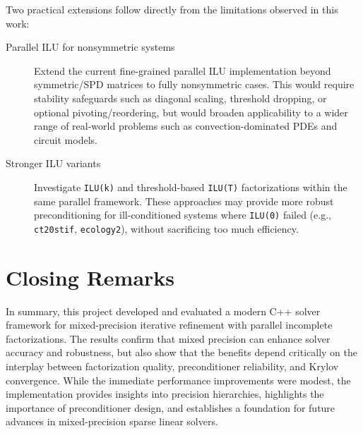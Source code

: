 Two practical extensions follow directly from the limitations observed in this
work:

\begin{description}
\item[Parallel ILU for nonsymmetric systems] Extend the current fine-grained
  parallel ILU implementation beyond symmetric/SPD matrices to fully
  nonsymmetric cases. This would require stability safeguards such as diagonal
  scaling, threshold dropping, or optional pivoting/reordering, but would
  broaden applicability to a wider range of real-world problems such as
  convection-dominated PDEs and circuit models.

\item[Stronger ILU variants] Investigate \texttt{ILU(k)} and threshold-based \texttt{ILU(T)}
  factorizations within the same parallel framework. These approaches may
  provide more robust preconditioning for ill-conditioned systems where
  \texttt{ILU(0)} failed (e.g., \texttt{ct20stif}, \texttt{ecology2}), without
  sacrificing too much efficiency.
\end{description}

\section*{Closing Remarks}

In summary, this project developed and evaluated a modern C++ solver framework
for mixed-precision iterative refinement with parallel incomplete
factorizations. The results confirm that mixed precision can enhance solver
accuracy and robustness, but also show that the benefits depend critically on
the interplay between factorization quality, preconditioner reliability, and
Krylov convergence. While the immediate performance improvements were modest,
the implementation provides insights into precision hierarchies, highlights the
importance of preconditioner design, and establishes a foundation for future
advances in mixed-precision sparse linear solvers.
